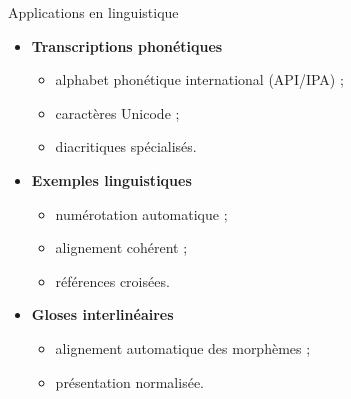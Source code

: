 \documentclass[aspectratio=169]{beamer}
\begin{document}
	\begin{frame}{Applications en linguistique}
		\begin{itemize}
			\item \textbf{Transcriptions phonétiques}
			\begin{itemize}
				\item alphabet phonétique international (API/IPA) ;
				\item caractères Unicode ;
				\item diacritiques spécialisés.
			\end{itemize}
			
			\vspace{0.3cm}
			
			\item \textbf{Exemples linguistiques}
			\begin{itemize}
				\item numérotation automatique ;
				\item alignement cohérent ;
				\item références croisées.
			\end{itemize}
			
			\vspace{0.3cm}
			
			\item \textbf{Gloses interlinéaires}
			\begin{itemize}
				\item alignement automatique des morphèmes ;
				\item présentation normalisée.
			\end{itemize}
		\end{itemize}
	\end{frame}
	
	
\end{document}
